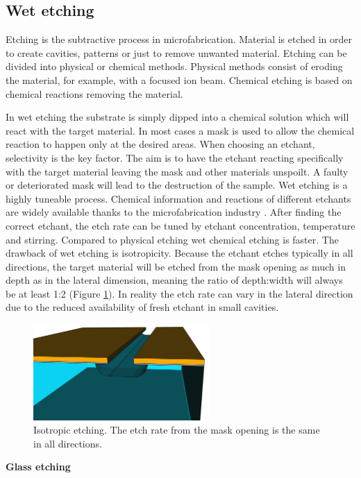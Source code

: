 \documentclass[final]{jyflluk}
\begin{document}
\subsection{Wet etching}
\label{sec:xx4}

Etching is the subtractive process in microfabrication. Material is etched in order to create cavities, patterns or just to remove unwanted material. Etching can be divided into physical or chemical methods. Physical methods consist of eroding the material, for example, with a focused ion beam. Chemical etching is based on chemical reactions removing the material. 

In wet etching the substrate is simply dipped into a chemical solution which will react with the target material. In most cases a mask is used to allow the chemical reaction to happen only at the desired areas. When choosing an etchant, selectivity is the key factor. The aim is to have the etchant reacting specifically with the target material leaving the mask and other materials unspoilt. A faulty or deteriorated mask will lead to the destruction of the sample. 
Wet etching is a highly tuneable process. Chemical information and reactions of different etchants are widely available thanks to the microfabrication industry \cite{williams2003etch}. After finding the correct etchant, the etch rate can be tuned by etchant concentration, temperature and stirring. Compared to physical etching wet chemical etching is faster. The drawback of wet etching is isotropicity. Because the etchant etches typically in all directions, the target material will be etched from the mask opening as much in depth as in the lateral dimension, meaning the ratio of depth:width will always be at least 1:2 (Figure \ref{fig:isotropy}). In reality the etch rate can vary in the lateral direction due to the reduced availability of fresh etchant in small cavities. \cite{lee2010microfabrication}
\begin{figure}[h]
    \centering
    \hspace*{1cm}\includegraphics[width=0.6\textwidth]{images/isotrpy.png}\hspace*{-1cm}
    \caption{Isotropic etching. The etch rate from the mask opening is the same in all directions.}
    \label{fig:isotropy}
\end{figure}
\newline
\newline
\textbf{Glass etching}
\end{document}
